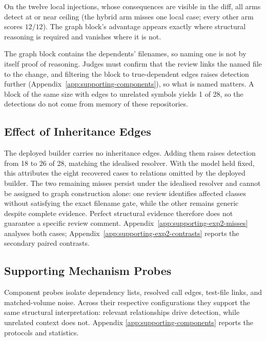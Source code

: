 On the twelve local injections, whose consequences are visible in the diff,
all arms detect at or near ceiling (the hybrid arm misses one local case;
every other arm scores $12/12$). The graph block's advantage appears exactly
where structural reasoning is required and vanishes where it is not.

The graph block contains the dependents' filenames, so naming one is not
by itself proof of reasoning. Judges must confirm that the review links
the named file to the change, and filtering the block to true-dependent
edges raises detection further (Appendix~\ref{app:supporting-components}),
so what is named matters. A block of the same size with edges to unrelated
symbols yields 1 of 28, so the detections do not come from memory of these
repositories.

\subsection{Effect of Inheritance Edges}
\label{sec:results-exp2-inheritance}

The deployed builder carries no inheritance edges. Adding them raises
detection from 18 to 26 of 28, matching the idealised resolver. With the model
held fixed, this attributes the eight
recovered cases to relations omitted by the deployed builder. The two
remaining misses persist under the idealised resolver and cannot be assigned
to graph construction alone: one review identifies affected classes without
satisfying the exact filename gate, while the other remains generic despite
complete evidence. Perfect structural evidence therefore does not guarantee a
specific review comment. Appendix~\ref{app:supporting-exp2-misses} analyses
both cases; Appendix~\ref{app:supporting-exp2-contrasts} reports the secondary
paired contrasts.

\subsection{Supporting Mechanism Probes}

Component probes isolate dependency lists, resolved call edges, test-file
links, and matched-volume noise. Across their respective configurations they
support the same structural interpretation: relevant relationships drive
detection, while unrelated context does not. Appendix
\ref{app:supporting-components} reports the protocols and statistics.

